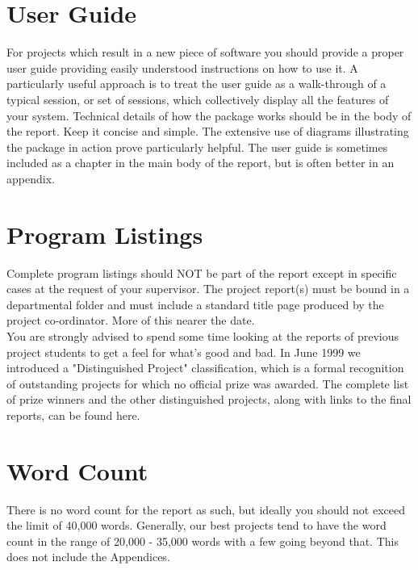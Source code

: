 \documentclass[12pt,twoside]{article}
\begin{document}
\section{User Guide}
For projects which result in a new piece of software you should provide a proper user guide providing easily understood instructions on how to use it. A particularly useful approach is to treat the user guide as a walk-through of a typical session, or set of sessions, which collectively display all the features of your system. Technical details of how the package works should be in the body of the report. Keep it concise and simple. The extensive use of diagrams illustrating the package in action prove particularly helpful. The user guide is sometimes included as a chapter in the main body of the report, but is often better in an appendix.\\


\newpage

\section{Program Listings}
Complete program listings should NOT be part of the report except in specific cases at the request of your supervisor. The project report(s) must be bound in a departmental folder and must include a standard title page produced by the project co-ordinator. More of this nearer the date.\\
You are strongly advised to spend some time looking at the reports of previous project students to get a feel for what's good and bad. In June 1999 we introduced a "Distinguished Project" classification, which is a formal recognition of outstanding projects for which no official prize was awarded. The complete list of prize winners and the other distinguished projects, along with links to the final reports, can be found here.\\

\newpage

\section{Word Count}
There is no word count for the report as such, but ideally you should not exceed the limit of 40,000 words. Generally, our best projects tend to have the word count in the range of 20,000 - 35,000 words with a few going beyond that. This does not include the Appendices.\\





\end{document}
